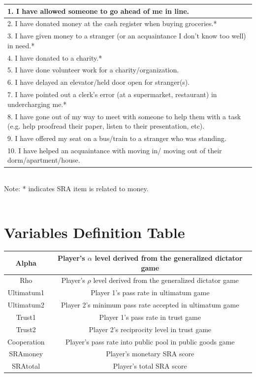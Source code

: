 \documentclass[12pt]{article}
\begin{document}
\begin{tabular}{ | p{12cm} | }
\hline
1. I have allowed someone to go ahead of me in line.\\
\hline
2. I have donated money at the cash register when buying groceries.*\\
\hline
3. I have given money to a stranger (or an acquaintance I don\rq t know too well) in need.*\\ 
\hline
4. I have donated to a charity.*\\
\hline
5. I have done volunteer work for a charity/organization.\\
\hline
6. I have delayed an elevator/held door open for stranger(s).\\
\hline
7.  I have pointed out a clerk\rq s error (at a supermarket, restaurant) in undercharging me.*\\
\hline
8. I have gone out of my way to meet with someone to help them with a task (e.g. help proofread their paper, listen to their presentation, etc). \\
\hline
9. I have offered my seat on a bus/train to a stranger who was standing.\\
\hline
10. I have helped an acquaintance with moving in/ moving out of their dorm/apartment/house.\\
\hline
\end{tabular} \\
\small Note: * indicates SRA item is related to money. \\ \\

\section{Variables Definition Table} \label{app:c}

\begin{center}
\begin{tabular}{ |c|c| } 
 \hline
 Alpha & Player\rq s \(\alpha\) level derived from the generalized dictator game \\ 
 \hline
  Rho & Player\rq s \(\rho\) level derived from the generalized dictator game \\ 
 \hline
 Ultimatum1 & Player 1\rq s pass rate in ultimatum game \\ 
 \hline
 Ultimatum2 & Player 2\rq s minimum pass rate accepted in ultimatum game  \\ 
 \hline
 Trust1 & Player 1\rq s pass rate in trust game \\ 
 \hline
 Trust2 & Player 2\rq s reciprocity level in trust game \\ 
 \hline
 Cooperation & Player\rq s pass rate into public pool in public goods game  \\ 
 \hline
 SRAmoney & Player\rq s monetary SRA score \\ 
 \hline
 SRAtotal & Player\rq s total SRA score \\ 
\hline
\end{tabular}
\end{center}
\end{document}

